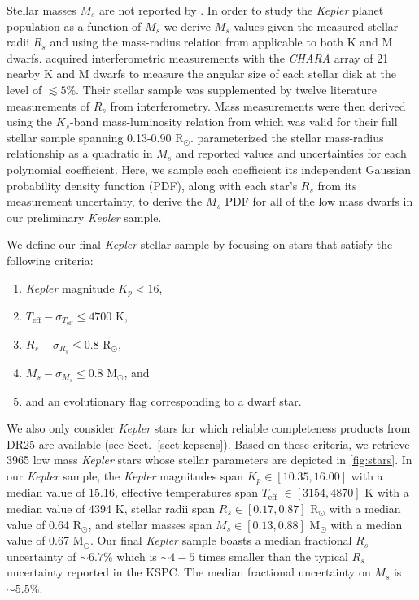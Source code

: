 \documentclass[twocolumn]{emulateapj}
\newcommand{\kepler}[1]{\emph{Kepler}#1}
\newcommand{\teff}[1]{$T_{\text{eff}}$#1}
\begin{document}
Stellar masses $M_s$ are not reported by \cite{berger18}. In order to study the \kepler{} planet population as a function of $M_s$
we derive $M_s$ values given the measured stellar radii $R_s$ and using the mass-radius relation from \cite{boyajian12} 
applicable to both K and M dwarfs.
\cite{boyajian12} acquired interferometric measurements with the \emph{CHARA} array of 21 nearby K and M dwarfs
to measure the angular size of each stellar disk at the level of $\lesssim 5$\%. Their stellar sample was supplemented by twelve
literature measurements of $R_s$ from interferometry. Mass measurements were then derived using the $K_s$-band mass-luminosity
relation from \cite{henry93} which was valid for their full stellar sample spanning 0.13-0.90 R$_{\odot}$. \cite{boyajian12}
parameterized the stellar mass-radius relationship as a quadratic in $M_s$ and reported values and uncertainties for each polynomial
coefficient. Here, we sample each coefficient its independent Gaussian probability density function (PDF), along with
each star's $R_s$ from its measurement uncertainty, to derive the $M_s$ PDF for all of the low mass dwarfs
in our preliminary \kepler{} sample.

We define our final \kepler{} stellar sample by focusing on stars that satisfy the following criteria:

\begin{enumerate}
\item \kepler{} magnitude $K_p < 16$,
\item $T_{\text{eff}} - \sigma_{T_{\text{eff}}} \leq 4700$ K,
\item $R_s - \sigma_{R_s} \leq 0.8$ R$_{\odot}$,
\item $M_s - \sigma_{M_s} \leq 0.8$ M$_{\odot}$, and
\item and an evolutionary flag corresponding to a dwarf star. 
\end{enumerate}

\noindent We also only consider \kepler{} stars for which reliable completeness products from DR25
are available (see Sect.~\ref{sect:kepsens}). Based on these criteria, we retrieve 3965 low mass \kepler{}
stars whose stellar parameters are depicted in \autoref{fig:stars}.
In our \kepler{} sample, the \kepler{} magnitudes span $K_p \in [10.35, 16.00]$ with a median value of 15.16,
effective temperatures span \teff{} $\in [3154, 4870]$ K with a median value of 4394 K,
stellar radii span $R_s \in [0.17, 0.87]$ R$_{\odot}$ with a median value of 0.64 R$_{\odot}$, and
stellar masses span $M_s \in [0.13, 0.88]$ M$_{\odot}$ with a median value of 0.67 M$_{\odot}$.
Our final \kepler{} sample boasts a median fractional $R_s$ uncertainty of $\sim 6.7$\% which is $\sim 4-5$
times smaller than the typical $R_s$ uncertainty reported in the KSPC. The median fractional uncertainty on
$M_s$ is $\sim 5.5$\%.
\end{document}
